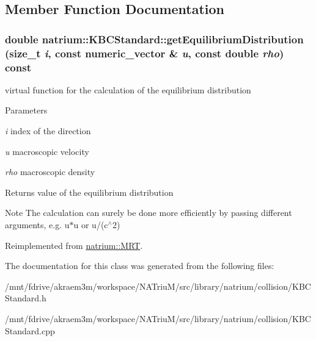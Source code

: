\subsection{Member Function Documentation}
\hypertarget{classnatrium_1_1KBCStandard_a1dac2deaafb93027bf168887dd2e002d}{
\subsubsection[{getEquilibriumDistribution}]{\setlength{\rightskip}{0pt plus 5cm}double natrium::KBCStandard::getEquilibriumDistribution (size\_\-t {\em i}, \/  const {\bf numeric\_\-vector} \& {\em u}, \/  const double {\em rho}) const}}
\label{classnatrium_1_1KBCStandard_a1dac2deaafb93027bf168887dd2e002d}


virtual function for the calculation of the equilibrium distribution 
\begin{DoxyParams}{Parameters}
\item[{\em i}]index of the direction \item[{\em u}]macroscopic velocity \item[{\em rho}]macroscopic density \end{DoxyParams}
\begin{DoxyReturn}{Returns}
value of the equilibrium distribution 
\end{DoxyReturn}
\begin{DoxyNote}{Note}
The calculation can surely be done more efficiently by passing different arguments, e.g. u$\ast$u or u/(c$^\wedge$2) 
\end{DoxyNote}


Reimplemented from \hyperlink{classnatrium_1_1MRT_a3f96915f9f67680f4a1d7b952e70be55}{natrium::MRT}.

The documentation for this class was generated from the following files:\begin{DoxyCompactItemize}
\item 
/mnt/fdrive/akraem3m/workspace/NATriuM/src/library/natrium/collision/KBCStandard.h\item 
/mnt/fdrive/akraem3m/workspace/NATriuM/src/library/natrium/collision/KBCStandard.cpp\end{DoxyCompactItemize}

